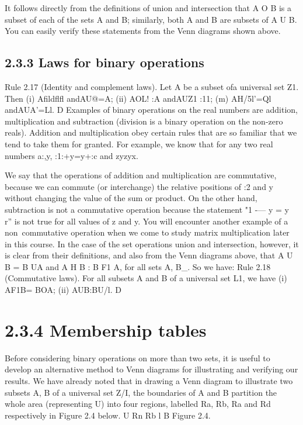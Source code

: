 {{%
It follows directly from the deﬁnitions of union and intersection that A O B is a subset of each
of the sets A and B; similarly, both A and B are subsets of A U B. You can easily verify these
statements from the Venn diagrams shown above.

\subsection{2.3.3 Laws for binary operations}
Rule 2.17 (Identity and complement laws). Let A be a subset ofa universal set Z1. Then
(i) Aﬁldflﬂ andAU@=A;
(ii) AOL! :A andAUZ1 :11;
(m) AH/5l'=Ql andAUA’=Ll. D
Examples of binary operations on the real numbers are addition, multiplication and subtraction
(division is a binary operation on the non-zero reals). Addition and multiplication obey certain
rules that are so familiar that we tend to take them for granted. For example, we know that for
any two real numbers a:,y,
:1:+y=y+:c and zyzyx.


We say that the operations of addition and multiplication are commutative, because we can
commute (or interchange) the relative positions of :2 and y without changing the value of the sum
or product. On the other hand, subtraction is not a commutative operation because the statement
"1 -— y = y ~ r” is not true for all values of z and y. You will encounter another example of a
non~commutative operation when we come to study matrix multiplication later in this course.
In the case of the set operations union and intersection, however, it is clear from their deﬁnitions,
and also from the Venn diagrams above, that A U B = B UA and A H B : B F1 A, for all sets A, B_.
So we have:
Rule 2.18 (Commutative laws). For all subsets A and B of a universal set L1, we have
(i) AF1B= BOA; (ii) AUB:BU/l. D
\section{2.3.4 Membership tables}
Before considering binary operations on more than two sets, it is useful to develop an alternative
method to Venn diagrams for illustrating and verifying our results.
We have already noted that in drawing a Venn diagram to illustrate two subsets A, B of a universal
set Z/I, the boundaries of A and B partition the whole area (representing U) into four regions,
labelled Ra, Rb, Ra and Rd respectively in Figure 2.4 below.
U
Rn
Rb
l B
Figure 2.4.

}}
